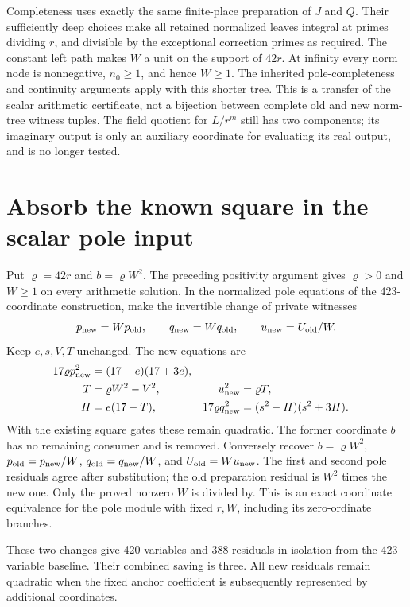 Completeness uses exactly the same finite-place preparation of $J$ and
$Q$.  Their sufficiently deep choices make all retained normalized
leaves integral at primes dividing $r$, and divisible by the exceptional
correction primes as required.  The constant left path makes $W$ a unit
on the support of $42r$.  At infinity every norm node is nonnegative,
$n_0\ge1$, and hence $W\ge1$.  The inherited pole-completeness and
continuity arguments apply with this shorter tree.  This is a transfer
of the scalar arithmetic certificate, not a bijection between complete
old and new norm-tree witness tuples.  The field quotient for $L/r^m$
still has two components; its imaginary output is only an auxiliary
coordinate for evaluating its real output, and is no longer tested.

\section{Absorb the known square in the scalar pole input}

Put $\varrho=42r$ and $b=\varrho W^2$.  The preceding positivity
argument gives $\varrho>0$ and $W\ge1$ on every arithmetic solution.
In the normalized pole equations of the 423-coordinate construction,
make the invertible change of private witnesses
\[
 p_{\rm new}=Wp_{\rm old},\qquad q_{\rm new}=Wq_{\rm old},
 \qquad u_{\rm new}=U_{\rm old}/W.
\]
Keep $e,s,V,T$ unchanged.  The new equations are
\begin{align*}
 17\varrho p_{\rm new}^2&=(17-e)(17+3e),\\
 T&=\varrho W^2-V^2,&u_{\rm new}^2&=\varrho T,\\
 H&=e(17-T),&
 17\varrho q_{\rm new}^2&=(s^2-H)(s^2+3H).
\end{align*}
With the existing square gates these remain quadratic.  The former
coordinate $b$ has no remaining consumer and is removed.  Conversely
recover $b=\varrho W^2$, $p_{\rm old}=p_{\rm new}/W$,
$q_{\rm old}=q_{\rm new}/W$, and $U_{\rm old}=Wu_{\rm new}$.
The first and second pole residuals agree after substitution; the old
preparation residual is $W^2$ times the new one.  Only the proved
nonzero $W$ is divided by.  This is an exact coordinate equivalence
for the pole module with fixed $r,W$, including its zero-ordinate branches.

These two changes give 420 variables and 388 residuals in isolation
from the 423-variable baseline.  Their combined saving is three.
All new residuals remain quadratic when the fixed anchor coefficient is
subsequently represented by additional coordinates.
